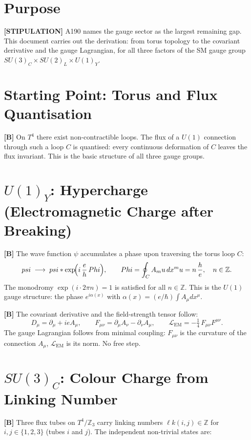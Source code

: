 \section{Purpose}

\textbf{[STIPULATION]} A190 names the gauge sector as the largest remaining gap.
This document carries out the derivation: from torus topology to the covariant
derivative and the gauge Lagrangian, for all three factors of the SM gauge group
$SU(3)_C\times SU(2)_L\times U(1)_Y$.

\section{Starting Point: Torus and Flux Quantisation}

\textbf{[B]} On $T^4$ there exist non-contractible loops. The flux of a
$U(1)$ connection through such a loop $C$ is quantised: every continuous
deformation of $C$ leaves the flux invariant. This is the basic structure of all
three gauge groups.

\section{$U(1)_Y$: Hypercharge (Electromagnetic Charge after Breaking)}

\textbf{[B]} The wave function $\psi$ accumulates a phase upon traversing the
torus loop $C$:
\[
  \psi \;\longrightarrow\; \psi\cdot\exp\!\Bigl(i\,\frac{e}{\hbar}\,\Phi\Bigr),
  \qquad \Phi = \oint_C A_\mu\,dx^\mu = n\,\frac{h}{e},\quad n\in\mathbb{Z}.
\]
The monodromy $\exp(i\cdot 2\pi n)=1$ is satisfied for all $n\in\mathbb{Z}$.
This is the $U(1)$ gauge structure: the phase $e^{i\alpha(x)}$ with
$\alpha(x) = (e/\hbar)\int A_\mu dx^\mu$.

\textbf{[B]} The covariant derivative and the field-strength tensor follow:
\[
  D_\mu = \partial_\mu + ieA_\mu,
  \qquad
  F_{\mu\nu} = \partial_\mu A_\nu - \partial_\nu A_\mu,
  \qquad
  \mathcal{L}_\text{EM} = -\tfrac14\,F_{\mu\nu}F^{\mu\nu}.
\]
The gauge Lagrangian follows from minimal coupling: $F_{\mu\nu}$ is the curvature
of the connection $A_\mu$, $\mathcal{L}_\text{EM}$ is its norm. No free step.

\section{$SU(3)_C$: Colour Charge from Linking Number}

\textbf{[B]} Three flux tubes on $T^4/\mathbb{Z}_3$ carry linking numbers
$\ell k(i,j)\in\mathbb{Z}$ for $i,j\in\{1,2,3\}$ (tubes $i$ and $j$).
The independent non-trivial states are:

